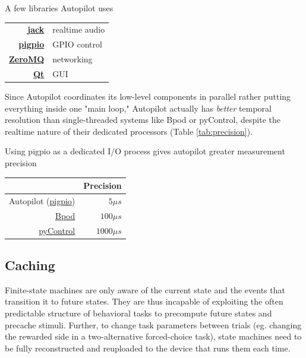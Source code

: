 \begin{margintable}[0.1cm]
\caption{A few libraries Autopilot uses}
\label{tab:libraries}
\noindent\begin{tabularx}{\linewidth}{Rl}
\toprule
 \textbf{\href{http://jackaudio.org/}{jack}} & realtime audio \\
 \textbf{\href{http://abyz.me.uk/rpi/pigpio/index.html}{pigpio}} & GPIO control \\
 \textbf{\href{http://zeromq.org/}{ZeroMQ}} & networking \\
 \textbf{\href{https://www.qt.io/}{Qt}} & GUI \\
 \bottomrule
\end{tabularx}

\end{margintable}

Since Autopilot coordinates its low-level components in parallel rather putting everything inside one "main loop," Autopilot actually has \textit{better} temporal resolution than  single-threaded systems like Bpod or pyControl, despite the realtime nature of their dedicated processors (Table \ref{tab:precision}).

\begin{margintable}
\caption{Using pigpio as a dedicated I/O process gives autopilot greater measurement precision}
\label{tab:precision}
\noindent\begin{tabularx}{\linewidth}{rR}\toprule
& Precision \\
\midrule
Autopilot (\href{http://abyz.me.uk/rpi/pigpio/pigpiod.html}{pigpio}) & $5\mu s$ \\
\href{https://github.com/sanworks/Bpod_StateMachine_Firmware/blob/059d1e9195f5bb7d0d5cd7b33f56342eb5a3a55c/Dev/StateMachineFirmware/StateMachineFirmware.ino\#L196}{Bpod} & $100\mu s$ \\
\href{https://bitbucket.org/takam/pycontrol/src/c678552ac57be2108a5461e0c5f8051ce7d3816a/pyControl/framework.py?at=default\&fileviewer=file-view-default\#framework.py-278}{pyControl} & $1000\mu s$ \\
\bottomrule
\end{tabularx}
\end{margintable}

\subsection{Caching}

Finite-state machines are only aware of the current state and the events that transition it to future states. They are thus incapable of exploiting the often predictable structure of behavioral tasks to precompute future states and precache stimuli. Further, to change task parameters between trials (eg. changing the rewarded side in a two-alternative forced-choice task), state machines need to be fully reconstructed and reuploaded to the device that runs them each time.

